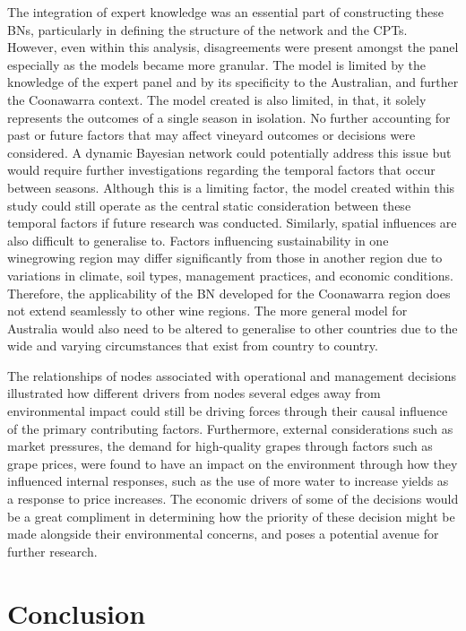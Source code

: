 \documentclass[fleqn,10pt]{wlscirep}
\begin{document}
The integration of expert knowledge was an essential part of constructing these BNs, particularly in defining the structure of the network and the CPTs. However, even within this analysis, disagreements were present amongst the panel especially as the models became more granular. The model is limited by the knowledge of the expert panel and by its specificity to the Australian, and further the Coonawarra context. The model created is also limited, in that, it solely represents the outcomes of a single season in isolation. No further accounting for past or future factors that may affect vineyard outcomes or decisions were considered. A dynamic Bayesian network could potentially address this issue but would require further investigations regarding the temporal factors that occur between seasons. Although this is a limiting factor, the model created within this study could still operate as the central static consideration between these temporal factors if future research was conducted. Similarly, spatial influences are also difficult to generalise to. Factors influencing sustainability in one winegrowing region may differ significantly from those in another region due to variations in climate, soil types, management practices, and economic conditions. Therefore, the applicability of the BN developed for the Coonawarra region does not extend seamlessly to other wine regions. The more general model for Australia would also need to be altered to generalise to other countries due to the wide and varying circumstances that exist from country to country.

The relationships of nodes associated with operational and management  decisions illustrated how different drivers from nodes several edges away from environmental impact could still be driving forces through their causal influence of the primary contributing factors. Furthermore, external considerations such as market pressures, the demand for high-quality grapes through factors such as grape prices, were found to have an impact on the environment through how they influenced internal responses, such as the use of more water to increase yields as a response to price increases. The economic drivers of some of the decisions would be a great compliment in determining how the priority of these decision might be made alongside their environmental concerns, and poses a potential avenue for further research.

\section*{Conclusion}
\end{document}
